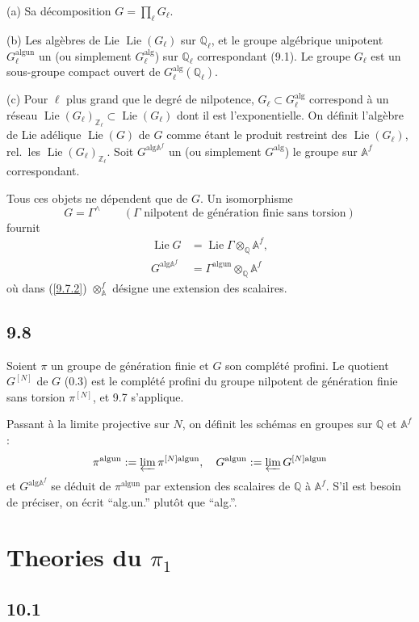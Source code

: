 \documentclass[12pt,a4paper]{article}
\theoremstyle{plain}
\theoremstyle{definition}
\theoremstyle{remark}
\DeclareMathOperator{\Lie}{Lie}
\newcommand{\Q}{\mathbb{Q}}
\newcommand{\Z}{\mathbb{Z}}
\newcommand{\Af}{\mathbb{A}^f}
\newcommand{\alg}{\mathrm{alg}}
\newcommand{\un}{\mathrm{un}}
\begin{document}
(a) Sa d\'ecomposition $G = \prod_\ell G_\ell$.

(b) Les alg\`ebres de Lie $\Lie(G_\ell)$ sur $\Q_\ell$, et le groupe alg\'ebrique unipotent $G_\ell^{\alg \un}$ un (ou simplement $G_\ell^{\alg}$) sur $\Q_\ell$ correspondant (9.1). Le groupe $G_\ell$ est un sous-groupe compact ouvert de $G_\ell^{\alg}(\Q_\ell)$.

(c) Pour $\ell$ plus grand que le degr\'e de nilpotence, $G_\ell \subset G_\ell^{\alg}$ correspond \`a un r\'eseau $\Lie(G_\ell)_{\Z_\ell} \subset \Lie(G_\ell)$ dont il est l'exponentielle. On d\'efinit l'alg\`ebre de Lie ad\'elique $\Lie(G)$ de $G$ comme \'etant le produit restreint des $\Lie(G_\ell)$, rel.~les $\Lie(G_\ell)_{\Z_\ell}$. Soit $G^{\alg \Af}$ un (ou simplement $G^{\alg}$) le groupe sur $\Af$ correspondant.

Tous ces objets ne d\'ependent que de $G$. Un isomorphisme
$$G = \Gamma^\wedge \qquad (\Gamma \text{ nilpotent de g\'en\'eration finie sans torsion})$$
fournit
\begin{align}
\Lie G &= \Lie \Gamma \otimes_\Q \Af, \label{9.7.1} \\
G^{\alg \Af} &= \Gamma^{\alg \un} \otimes_\Q \Af \label{9.7.2}
\end{align}
o\`u dans (\ref{9.7.2}) $\otimes_\Af$ d\'esigne une extension des scalaires.

\subsection*{9.8}

Soient $\pi$ un groupe de g\'en\'eration finie et $G$ son compl\'et\'e profini. Le quotient $G^{[N]}$ de $G$ (0.3) est le compl\'et\'e profini du groupe nilpotent de g\'en\'eration finie sans torsion $\pi^{[N]}$, et 9.7 s'applique.

Passant \`a la limite projective sur $N$, on d\'efinit les sch\'emas en groupes sur $\Q$ et $\Af$ :
$$\pi^{\alg \un} := \varprojlim \pi^{[N] \alg \un}, \quad G^{\alg \un} := \varprojlim G^{[N] \alg \un}$$
et $G^{\alg \Af}$ se d\'eduit de $\pi^{\alg \un}$ par extension des scalaires de $\Q$ \`a $\Af$. S'il est besoin de pr\'eciser, on \'ecrit ``alg.un.'' plut\^ot que ``alg.''.



\section{Theories du $\pi_1$}

\subsection*{10.1}
\end{document}
